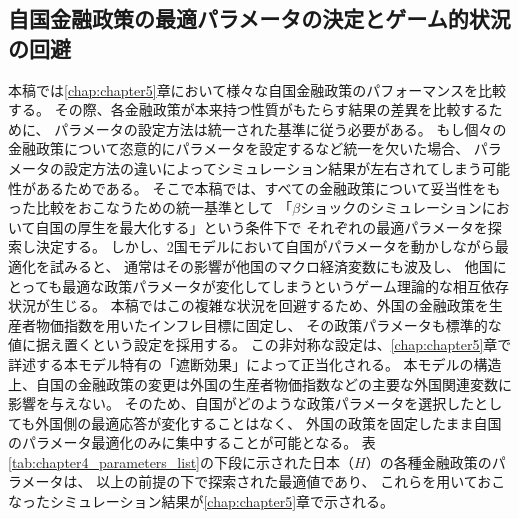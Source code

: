 
\subsection{自国金融政策の最適パラメータの決定とゲーム的状況の回避}
\label{sec:chapter4parameters_monetary_optimization}
本稿では\ref{chap:chapter5}章において様々な自国金融政策のパフォーマンスを比較する。
その際、各金融政策が本来持つ性質がもたらす結果の差異を比較するために、
パラメータの設定方法は統一された基準に従う必要がある。
もし個々の金融政策について恣意的にパラメータを設定するなど統一を欠いた場合、
パラメータの設定方法の違いによってシミュレーション結果が左右されてしまう可能性があるためである。
そこで本稿では、すべての金融政策について妥当性をもった比較をおこなうための統一基準として
「\(\beta\)ショックのシミュレーションにおいて自国の厚生を最大化する」という条件下で
それぞれの最適パラメータを探索し決定する。
しかし、2国モデルにおいて自国がパラメータを動かしながら最適化を試みると、
通常はその影響が他国のマクロ経済変数にも波及し、
他国にとっても最適な政策パラメータが変化してしまうというゲーム理論的な相互依存状況が生じる。
本稿ではこの複雑な状況を回避するため、外国の金融政策を生産者物価指数を用いたインフレ目標に固定し、
その政策パラメータも標準的な値に据え置くという設定を採用する。
この非対称な設定は、\ref{chap:chapter5}章で詳述する本モデル特有の「遮断効果」によって正当化される。
本モデルの構造上、自国の金融政策の変更は外国の生産者物価指数などの主要な外国関連変数に影響を与えない。
そのため、自国がどのような政策パラメータを選択したとしても外国側の最適応答が変化することはなく、
外国の政策を固定したまま自国のパラメータ最適化のみに集中することが可能となる。
表\ref{tab:chapter4_parameters_list}の下段に示された日本（\(H\)）の各種金融政策のパラメータは、
以上の前提の下で探索された最適値であり、
これらを用いておこなったシミュレーション結果が\ref{chap:chapter5}章で示される。